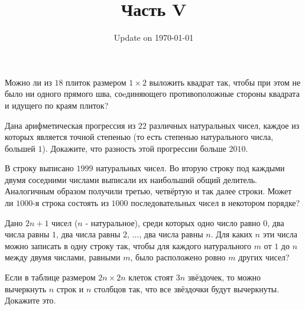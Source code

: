 \documentclass[12pt]{article}
\begin{document}
\fontsize{12}{12}\selectfont

\title{\bf \huge Часть V}
\date{Update on \today}
\maketitle 

\begin{task}
Можно ли из $18$ плиток размером $1 \times 2$ выложить квадрат так, чтобы при этом не было ни одного прямого шва, соeдиняющего противоположные стороны квадрата и идущего по краям плиток?
\end{task}

\begin{solution}

\end{solution}

\begin{task}
Дана арифметическая прогрессия из $22$ различных натуральных чисел, каждое из которых является точной степенью (то есть степенью натурального числа, большей $1$). Докажите, что разность этой прогрессии больше $2010$.
\end{task}

\begin{task}
В строку выписано $1999$ натуральных чисел. Во вторую строку под каждыми двумя соседними числами выписали их наибольший общий делитель. Аналогичным образом получили третью, четвёртую и так далее строки. Может ли $1000$-я строка состоять из $1000$ последовательных чисел в некотором порядке? 
\end{task}

\begin{task}
Дано $2n + 1$ чисел ($n$ - натуральное), среди которых одно число равно $0$, два числа равны $1$, два числа равны $2$, $\dots$, два числа равны $n$. Для каких $n$ эти числа можно записать в одну строку так, чтобы для каждого натурального $m$ от $1$ до $n$ между двумя числами, равными $m$, было расположено ровно  $m$ других чисел?
\end{task}

\begin{task}
Если в таблице размером $2n \times 2n$ клеток стоят $3n$ звёздочек, то можно вычеркнуть $n$ строк и $n$ столбцов так, что все звёздочки будут вычеркнуты. Докажите это.
\end{task}
\end{document}
